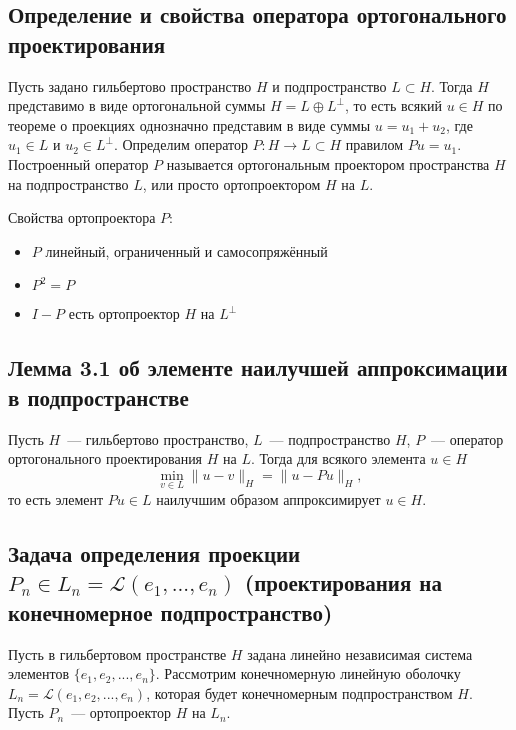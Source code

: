 \documentclass[a4paper,14pt]{article} %
\begin{document}

\subsection{Определение и свойства оператора ортогонального проектирования}

Пусть задано гильбертово пространство $H$ и подпространство $L \subset H$.
Тогда $H$ представимо в виде ортогональной суммы $H = L \oplus L^\perp$, то есть
всякий $u \in H$ по теореме о проекциях однозначно представим в виде суммы
$u = u_1 + u_2$, где $u_1 \in L$ и $u_2 \in L^\perp$.
Определим оператор $P : H \to L \subset H$
правилом $Pu = u_1$.
Построенный оператор $P$ называется ортогональным проектором пространства $H$ на подпространство $L$,
или просто ортопроектором $H$ на $L$.

Свойства ортопроектора $P$:
\begin{itemize}
	\item
		$P$ линейный, ограниченный и самосопряжённый
	\item
		$P^2 = P$
	\item
		$I-P$ есть ортопроектор $H$ на $L^\perp$
\end{itemize}

\subsection{Лемма 3.1 об элементе наилучшей аппроксимации в подпространстве}

Пусть $H$~--- гильбертово пространство,
$L$~--- подпространство $H$,
$P$~--- оператор ортогонального проектирования $H$ на $L$.
Тогда для всякого элемента $u \in H$
\begin{equation}
	\min_{v\in L} \|u - v\|_H = \|u - P u\|_H,
\end{equation}
то есть элемент $Pu \in L$ наилучшим образом аппроксимирует $u \in H$.

\subsection{Задача определения проекции $P_n\in L_n = \mathcal{L}(e_1,...,e_n)$ (проектирования на конечномерное подпространство)}

Пусть в гильбертовом пространстве $H$ задана линейно независимая система элементов
$\{e_1, e_2 , ... , e_n \}$.
Рассмотрим конечномерную линейную оболочку
$L_n = \mathcal{L} (e_1 , e_2 , ... , e_n )$,
которая будет конечномерным подпространством $H$.
Пусть $P_n$~--- ортопроектор $H$ на $L_n$.
\end{document}
